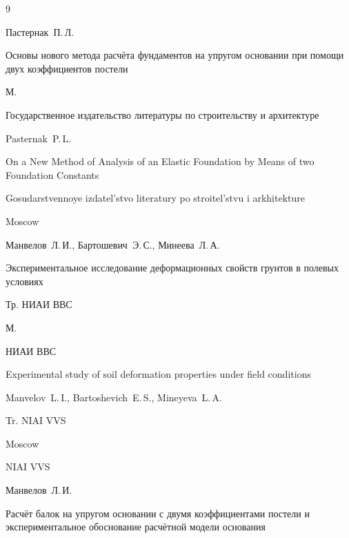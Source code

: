 \begin{thebibliography}{9}

\by Пастернак~П.\,Л.

\book Основы нового метода расчёта фундаментов на упругом основании при помощи двух коэффициентов постели

\publaddr М.

\publ Государственное издательство литературы по строительству и архитектуре



\misctransl

\by Pasternak~P.\,L.

\book On a New Method of Analysis of an Elastic Foundation by Means of two Foundation Constants

\publ Gosudarstvennoye izdatel'stvo literatury po stroitel'stvu i arkhitekture

\publaddr Moscow






\by Манвелов~Л.\,И., Бартошевич~Э.\,С., Минеева~Л.\,А.

\paper Экспериментальное исследование деформационных свойств грунтов в полевых условиях

\inbook Тр. НИАИ ВВС


\publaddr М.

\publ НИАИ ВВС



\misctransl

\paper Experimental study of soil deformation properties  under field conditions

\by Manvelov~L.\,I., Bartoshevich~E.\,S., Mineyeva~L.\,A. 

\inbook Tr. NIAI VVS 


\publaddr Moscow 

\publ NIAI VVS 






\by Манвелов~Л.\,И.

\paper Расчёт балок на упругом основании с двумя коэффициентами постели и экспериментальное обоснование расчётной модели основания


\end{thebibliography}

